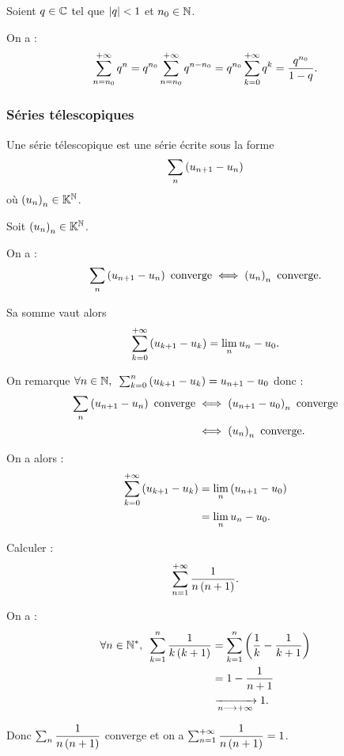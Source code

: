 \begin{rem}
Soient \(q\in\mathbb{C}\) tel que \(\left\lvert q\right\rvert<1\) et \(n_0\in\mathbb{N}\).

On a : \[\sum_{n=n_0}^{+\infty}q^n=q^{n_0}\sum_{n=n_0}^{+\infty}q^{n-n_0}=q^{n_0}\sum_{k=0}^{+\infty}q^k=\dfrac{q^{n_0}}{1-q}.\]
\end{rem}

\subsubsection{Séries télescopiques}

\begin{defi}
Une série télescopique est une série écrite sous la forme \[\sum_n\left(u_{n+1}-u_n\right)\] où \(\left(u_n\right)_n\in\mathbb{K}^{\mathbb{N}}\).
\end{defi}

\begin{prop}
Soit \(\left(u_n\right)_n\in\mathbb{K}^{\mathbb{N}}\).

On a : \[\sum_n\left(u_{n+1}-u_n\right)\text{ converge}\iff\left(u_n\right)_n\text{ converge}.\]

Sa somme vaut alors \[\sum_{k=0}^{+\infty}\left(u_{k+1}-u_k\right)=\lim_nu_n-u_0.\]
\end{prop}

\begin{dem}
On remarque \(\quantifs{\forall n\in\N}\sum_{k=0}^n\paren{u_{k+1}-u_k}=u_{n+1}-u_0\) donc : \[\begin{aligned}
\sum_n\left(u_{n+1}-u_n\right)\text{ converge}&\iff\left(u_{n+1}-u_0\right)_n\text{ converge} \\
&\iff\left(u_n\right)_n\text{ converge}.
\end{aligned}\]

On a alors : \[\begin{aligned}
\sum_{k=0}^{+\infty}\left(u_{k+1}-u_k\right)&=\lim_n\left(u_{n+1}-u_0\right) \\
&=\lim_nu_n-u_0.
\end{aligned}\]
\end{dem}

\begin{exoex}
Calculer : \[\sum_{n=1}^{+\infty}\dfrac{1}{n\left(n+1\right)}.\]
\end{exoex}

\begin{corr}
On a : \[\begin{aligned}
\quantifs{\forall n\in\Ns}\sum_{k=1}^n\dfrac{1}{k\paren{k+1}}&=\sum_{k=1}^n\paren{\dfrac{1}{k}-\dfrac{1}{k+1}} \\
&=1-\dfrac{1}{n+1} \\
&\tendqd{n\to\pinf}1.
\end{aligned}\]

Donc \(\sum_n\dfrac{1}{n\left(n+1\right)}\) converge et on a \(\sum_{n=1}^{+\infty}\dfrac{1}{n\left(n+1\right)}=1\).
\end{corr}

